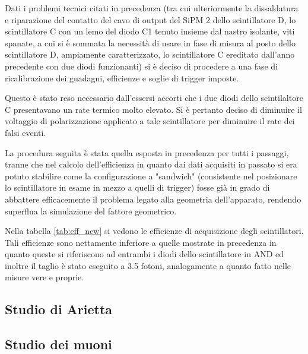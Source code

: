 Dati i problemi tecnici citati in precedenza (tra cui ulteriormente la dissaldatura e riparazione del contatto del cavo di output del SiPM 2 dello scintillatore D, lo scintillatore C con un lemo del diodo C1 tenuto insieme dal nastro isolante, viti spanate, a cui si \`e sommata la necessit\`a di usare in fase di misura al posto dello scintillatore D, ampiamente caratterizzato, lo scintillatore C ereditato dall'anno precedente con due diodi funzionanti) si \`e deciso di procedere a una fase di ricalibrazione dei guadagni, efficienze e soglie di trigger imposte.

Questo \`e stato reso necessario dall'essersi accorti che i due diodi dello scintilaltore C presentavano un rate termico molto elevato. Si \`e pertanto deciso di diminuire il voltaggio di polarizzazione applicato a tale scintillatore per diminuire il rate dei falsi eventi.

La procedura seguita \`e stata quella esposta in precedenza per tutti i passaggi, tranne che nel calcolo dell'efficienza in quanto dai dati acquisiti in passato si era  potuto stabilire come la configurazione a "sandwich" (consistente nel posizionare lo scintillatore in esame in mezzo a quelli di trigger) fosse gi\`a in grado di abbattere efficacemente il problema legato alla geometria dell'apparato, rendendo superflua la simulazione del fattore geometrico.


Nella tabella \ref{tab:eff_new} si vedono le efficienze di acquisizione degli scintillatori. Tali efficienze sono nettamente inferiore a quelle mostrate in precedenza in quanto queste si riferiscono ad entrambi i diodi dello scintillatore in AND ed inoltre il taglio \`e stato eseguito a 3.5 fotoni, analogamente a quanto fatto nelle misure vere e proprie.


\subsection{Studio di Arietta}


\subsection{Studio dei muoni}

